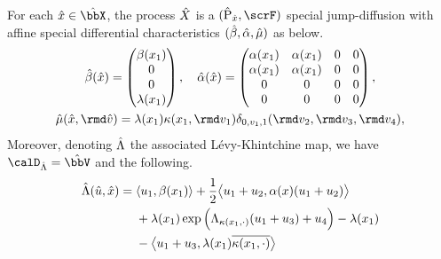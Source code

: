 \begin{proposition}
  \label{proposition:joint-characteristics}
  For each $\hat\stateVar \in \hat\stateSpace$, the process $\hat{X}$ is a $(\hat\Prb_{\hat\stateVar}, \scrF)$ special jump-diffusion with affine special differential characteristics $(\hat{\beta}, \hat{\alpha}, \hat{\mu})$ as below.
  \begin{equation}
    \label{eq:joint-characteristics}
    \begin{gathered}
      \hat\affDrift(\hat\stateVar) = \begin{pmatrix} \affDrift(\stateVar_1) \\ 0 \\ 0 \\ \affInt(\stateVar_1) \end{pmatrix}, \quad
      \hat\affDiff(\hat\stateVar) = \begin{pmatrix} \affDiff(\stateVar_1) & \affDiff(\stateVar_1) & 0 & 0 \\ \affDiff(\stateVar_1) & \affDiff(\stateVar_1) & 0 & 0 \\ 0 & 0 & 0 & 0 \\ 0 & 0 & 0 & 0 \end{pmatrix}, \\
      \hat\affJump(\hat\stateVar, \rmd\hat\markVar) = \affInt(\stateVar_1) \affDist(\stateVar_1, \rmd\markVar_1) \delta_{0,\markVar_1,1}(\rmd\markVar_2, \rmd\markVar_3, \rmd\markVar_4),
    \end{gathered}
  \end{equation}
  Moreover, denoting $\hat{\Lambda}$ the associated L\'evy-Khintchine map, we have $\odeSpaceJoint = \hat\vecSpace$ and the following.
  \begin{equation*}
    \hat{\Lambda}(\hat{u}, \hat{x}) = \begin{aligned}[t]
      &{\langle u_1 , \beta(x_1) \rangle} 
      + \frac12{\big\langle u_1+u_2 , \alpha(x)(u_1+u_2) \big\rangle} \\
      &+ \lambda(x_1)\exp\Big(\Lambda_{\kappa(x_1,\cdot)}(u_1+u_3) 
      + u_4\Big) 
      - \lambda(x_1) \\
      &-  {\big\langle u_1+u_3 , \lambda(x_1)\overline{\kappa(x_1,\cdot)} \big\rangle} 
    \end{aligned}
  \end{equation*}
\end{proposition}
